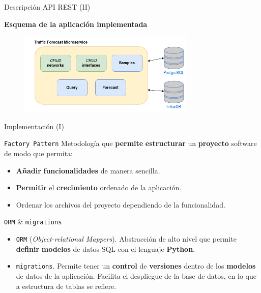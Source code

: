 \documentclass[aspectratio=169,xcolor=dvipsnames]{beamer}
\begin{document}
	
	\begin{frame}{Descripción API REST (II)}
		
		\textbf{Esquema de la aplicación implementada}
		
		\begin{figure}[h!]
			\begin{center}
				\includegraphics[width=0.75\textwidth]{diag/traffic_forecast_schema.png}
			\end{center}
		\end{figure}
	\end{frame}
	
	
	\begin{frame}{Implementación (I)}
		\begin{exampleblock}{\texttt{Factory Pattern}}
			Metodología que \textbf{permite} \textbf{estructurar} un \textbf{proyecto} software de modo que permita:
			\begin{itemize}
				\item \textbf{Añadir} \textbf{funcionalidades} de manera sencilla.
				\item \textbf{Permitir} el \textbf{crecimiento} ordenado de la aplicación.
				\item Ordenar los archivos del proyecto dependiendo de la funcionalidad.
			\end{itemize}
		\end{exampleblock}
	
		\begin{alertblock}{\texttt{ORM} \& \texttt{migrations}}
			\begin{itemize}
				\item \texttt{ORM} (\textit{Object-relational Mappers}). Abstracción de alto nivel que permite \textbf{definir} \textbf{modelos} de datos SQL con el lenguaje \textbf{Python}.
				
				\item \texttt{migrations}. Permite tener un \textbf{control} de \textbf{versiones} dentro de los \textbf{modelos} de datos de la aplicación. Facilita el despliegue de la base de datos, en lo que a estructura de tablas se refiere.	
		\end{itemize}
		\end{alertblock}
		
	\end{frame}
\end{document}
